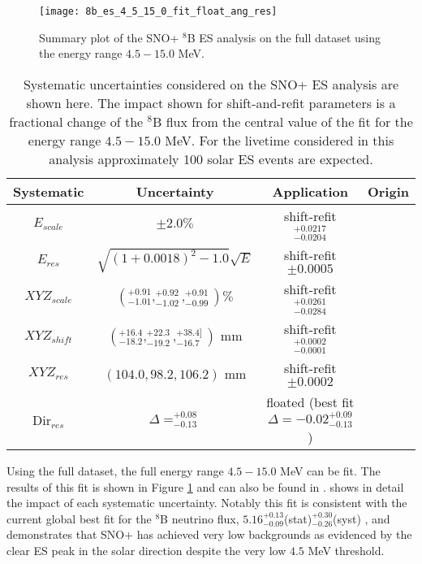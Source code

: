 \begin{figure}
\centering
\texttt{[image: 8b\_es\_4\_5\_15\_0\_fit\_float\_ang\_res]}
\caption{Summary plot of the SNO+ $^8$B ES analysis on the full dataset using the energy range $4.5-15.0$ MeV.}
\label{fig:solar:unpdated_fit_4.5}
\end{figure}

\begin{table}[]
\begin{center}
\begin{tabular}{c|c|c|c}
Systematic & Uncertainty & Application & Origin \\ \hline
$E_{scale}$     & $\pm 2.0\%$ & shift-refit $^{+0.0217}_{-0.0204}$ & \N \rule{0pt}{2.6ex}\rule[-1.2ex]{0pt}{0pt}  \\
$E_{res}$       & $\sqrt{(1+0.0018)^2-1.0}\sqrt{E}$ & shift-refit $\pm 0.0005$ & \N  \rule{0pt}{2.6ex}\rule[-1.2ex]{0pt}{0pt}  \\
${XYZ}_{scale}$ & $(^{+0.91}_{-1.01},^{+0.92}_{-1.02},^{+0.91}_{-0.99}) \%$ & shift-refit $^{+0.0261}_{-0.0284}$ & \N  \rule{0pt}{2.6ex}\rule[-1.2ex]{0pt}{0pt}  \\
${XYZ}_{shift}$ & $(^{+16.4}_{-18.2},^{+22.3}_{-19.2},^{+38.4]}_{-16.7})$ mm & shift-refit $^{+0.0002}_{-0.0001}$ & \N  \rule{0pt}{2.6ex}\rule[-1.2ex]{0pt}{0pt}  \\
${XYZ}_{res}$ & $(104.0,98.2,106.2)$ mm & shift-refit $\pm 0.0002$ & \N \rule{0pt}{2.6ex}\rule[-1.2ex]{0pt}{0pt}  \\
Dir$_{res}$     &  $\Delta = ^{+0.08}_{-0.13}$ & floated (best fit $\Delta = -0.02^{+0.09}_{-0.13}$) & \N \rule{0pt}{2.6ex}\rule[-1.2ex]{0pt}{0pt}  \\ \hline
\end{tabular}
\caption{ Systematic uncertainties considered on the SNO+ ES analysis are shown here.
The impact shown for shift-and-refit parameters is a fractional change of the $^8$B flux from the central value of the fit for the energy range $4.5-15.0$ MeV.
For the livetime considered in this analysis approximately 100 solar ES events are expected.}
\label{tbl:solar:updated_syst}
\end{center}
\end{table}

Using the full dataset, the full energy range $4.5-15.0$ MeV can be fit. 
The results of this fit is shown in Figure \ref{fig:solar:unpdated_fit_4.5} and can also be found in \cite{snoplus_solar}.
 shows in detail the impact of each systematic uncertainty. 
Notably this fit is consistent with the current global best fit for the $^8$B neutrino flux, $5.16^{+0.13}_{-0.09}$(stat)$^{+0.30}_{-0.26}$(syst) \cite{GlobalSolarFlux}, and demonstrates that SNO+ has achieved very low backgrounds as evidenced by the clear ES peak in the solar direction despite the very low $4.5$ MeV threshold.
